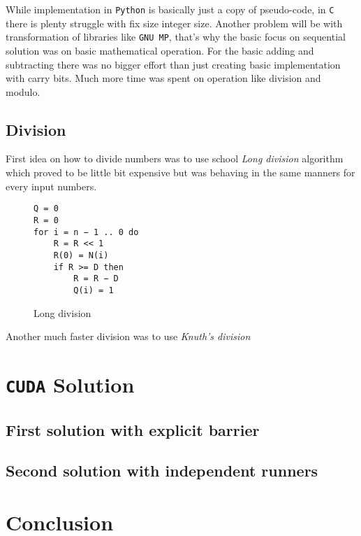 \documentclass[a4paper]{article}
\begin{document}
While implementation in \texttt{Python} is basically just a copy of pseudo-code, in \texttt{C} there is plenty struggle with fix size integer size. Another problem will be with transformation of libraries like \texttt{GNU MP}, that's why the basic focus on sequential solution was on basic mathematical operation. For the basic adding and subtracting there was no bigger effort than just creating basic implementation with carry bits. Much more time was spent on operation like division and modulo.

\subsection{Division}

First idea on how to divide numbers was to use school \emph{Long division} algorithm which proved to be little bit expensive but was behaving in the same manners for every input numbers.

\begin{figure}[H]
	\centering
	\begin{lstlisting}
Q = 0
R = 0                     
for i = n − 1 .. 0 do
    R = R << 1
    R(0) = N(i)
    if R >= D then
        R = R − D
        Q(i) = 1
	\end{lstlisting}
	\caption{Long division \cite{long_div}}
	\label{long_div}
\end{figure}

Another much faster division was to use \emph{Knuth's division}


\section{\texttt{CUDA} Solution}


\subsection{First solution with explicit barrier}


\subsection{Second solution with independent runners}


\section{Conclusion}





\appendix
\end{document}
